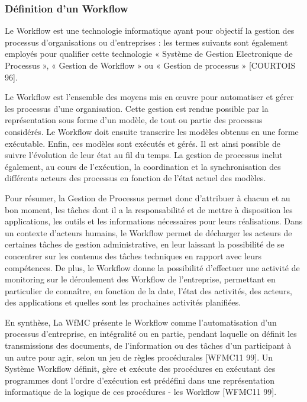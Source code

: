  	 
 	 
 	 
 	 \subsubsection{Définition d’un Workflow }
 	 
 	 
 	 Le Workflow est une technologie informatique ayant pour objectif la gestion des processus d’organisations ou d’entreprises : les termes suivants sont également employés pour qualifier cette technologie « Système de Gestion Electronique de Processus », « Gestion de Workflow » ou « Gestion de processus » [COURTOIS 96]. 
 	 
 	 Le Workflow est l’ensemble des moyens mis en œuvre pour automatiser et gérer les processus d’une organisation. Cette gestion est rendue possible par la représentation sous forme d’un modèle, de tout ou partie des processus considérés. Le Workflow doit ensuite transcrire les modèles obtenus en une forme exécutable. Enfin, ces modèles sont exécutés et gérés. Il est ainsi possible de suivre l’évolution de leur état au fil du temps. La gestion de processus inclut également, au cours de l’exécution, la coordination et la synchronisation des différents acteurs des processus en fonction de l’état actuel des modèles.
 	 
 	 Pour résumer, la Gestion de Processus permet donc d’attribuer à chacun et au bon moment, les tâches dont il a la responsabilité et de mettre à disposition les applications, les outils et les informations nécessaires pour leurs réalisations. Dans un contexte d’acteurs humains, le Workflow permet de décharger les acteurs de certaines tâches de gestion administrative, en leur laissant la possibilité de se concentrer sur les contenus des tâches techniques en rapport avec leurs compétences. De plus, le Workflow donne la possibilité d’effectuer une activité de monitoring sur le déroulement des Workflow de l’entreprise, permettant en particulier de connaître, en fonction de la date, l’état des activités, des acteurs, des applications et quelles sont les prochaines activités planifiées. 
 	 
 	 En synthèse, La WfMC présente le Workflow comme l’automatisation d’un processus d’entreprise, en intégralité ou en partie, pendant laquelle on définit les transmissions des documents, de l’information ou des tâches d’un participant à un autre pour agir, selon un jeu de règles procédurales [WFMC11 99]. Un Système Workflow définit, gère et exécute des procédures en exécutant des programmes dont l’ordre d’exécution est prédéfini dans une représentation informatique de la logique de ces procédures - les Workflow [WFMC11 99]. 
 	 
